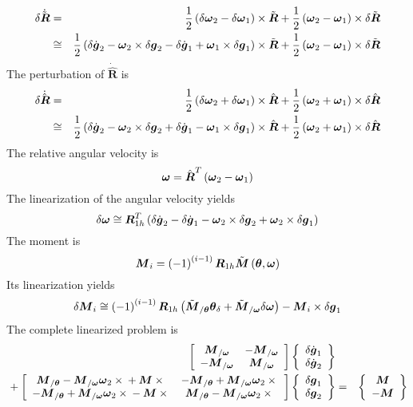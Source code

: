 \documentclass[10pt,dvips]{report}
\newcommand{\T}[1]{\boldsymbol{#1}}
\begin{document}
\begin{eqnarray*}
	\delta\dot{\tilde{\T{R}}}
	& = & \frac{1}{2}\plbr{\delta\T{\omega}_2 - \delta\T{\omega}_1}\times\tilde{\T{R}}
	+ \frac{1}{2}\plbr{\T{\omega}_2 - \T{\omega}_1}\times\delta\tilde{\T{R}} \\
	& \cong & \frac{1}{2}\plbr{
		\delta\dot{\T{g}}_2 - \T{\omega}_2\times\delta\T{g}_2
		- \delta\dot{\T{g}}_1 + \T{\omega}_1\times\delta\T{g}_1
	}\times\tilde{\T{R}}
	+ \frac{1}{2}\plbr{\T{\omega}_2 - \T{\omega}_1}\times\delta\tilde{\T{R}}
\end{eqnarray*}
The perturbation of $\dot{\hat{\T{R}}}$ is
\begin{eqnarray*}
	\delta\dot{\hat{\T{R}}}
	& = & \frac{1}{2}\plbr{\delta\T{\omega}_2 + \delta\T{\omega}_1}\times\hat{\T{R}}
	+ \frac{1}{2}\plbr{\T{\omega}_2 + \T{\omega}_1}\times\delta\hat{\T{R}} \\
	& \cong & \frac{1}{2}\plbr{
		\delta\dot{\T{g}}_2 - \T{\omega}_2\times\delta\T{g}_2
		+ \delta\dot{\T{g}}_1 - \T{\omega}_1\times\delta\T{g}_1
	}\times\hat{\T{R}}
	+ \frac{1}{2}\plbr{\T{\omega}_2 + \T{\omega}_1}\times\delta\hat{\T{R}}
\end{eqnarray*}
The relative angular velocity is
\begin{equation*}
	\T{\omega} = \hat{\T{R}}^T \plbr{\T{\omega}_2 - \T{\omega}_1}
\end{equation*}
The linearization of the angular velocity yields
\begin{equation*}
	\delta\T{\omega} \cong \T{R}_{1h}^T \plbr{
		\delta\dot{\T{g}}_2
		- \delta\dot{\T{g}}_1
		- \T{\omega}_2 \times \delta\T{g}_2
		+ \T{\omega}_2 \times \delta\T{g}_1
	}
\end{equation*}
The moment is
\begin{equation*}
	\T{M}_i = \plbr{ -1 }^{\plbr{i-1}} \T{R}_{1h} \tilde{\T{M}}\plbr{\T{\theta}, \T{\omega}}
\end{equation*}
Its linearization yields
\begin{equation*}
	\delta\T{M}_i \cong \plbr{ -1 }^{\plbr{i-1}} \T{R}_{1h} \plbr{
		\tilde{\T{M}}_{/\T{\theta}} \T{\theta}_{\delta}
		+ \tilde{\T{M}}_{/\T{\omega}} \delta\T{\omega}
	} - \T{M}_i \times \delta\T{g}_1
\end{equation*}
The complete linearized problem is
\begin{eqnarray*}
	\sqbr{\matr{cc}{
		\T{M}_{/\T{\omega}} & - \T{M}_{/\T{\omega}} \\
		- \T{M}_{/\T{\omega}} & \T{M}_{/\T{\omega}}
	}}\cubr{\cvvect{
		\delta\dot{\T{g}}_1 \\
		\delta\dot{\T{g}}_2
	}} & & \\
	\mbox{} + \sqbr{\matr{cc}{
		\T{M}_{/\T{\theta}} - \T{M}_{/\T{\omega}} \T{\omega}_2\times{} + \T{M}\times{} & 
			- \T{M}_{/\T{\theta}} + \T{M}_{/\T{\omega}} \T{\omega}_2\times{} \\
		- \T{M}_{/\T{\theta}} + \T{M}_{/\T{\omega}} \T{\omega}_2\times{} - \T{M}\times{} & 
			\T{M}_{/\T{\theta}} - \T{M}_{/\T{\omega}} \T{\omega}_2\times{}
	}}\cubr{\cvvect{
		\delta\T{g}_1 \\
		\delta\T{g}_2
	}} & = & \cubr{\cvvect{
		\T{M} \\
		- \T{M}
	}}
\end{eqnarray*}
\end{document}
